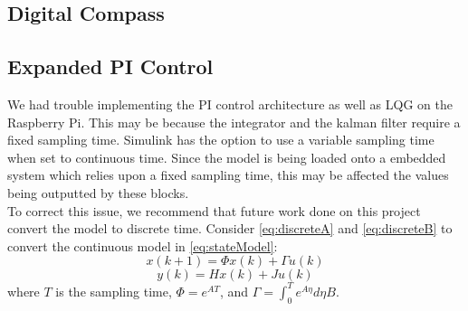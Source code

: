 \subsection{Digital Compass}

\subsection{Expanded PI Control}
We had trouble implementing the PI control architecture as well as LQG on the Raspberry Pi. This may be because the integrator and the kalman filter require a fixed sampling time.  Simulink has the option to use a variable sampling time when set to continuous time.  Since the model is being loaded onto a embedded system which relies upon a fixed sampling time, this may be affected the values being outputted by these blocks.\\
To correct this issue, we recommend that future work done on this project convert the model to discrete time.  Consider \ref{eq:discreteA} and \ref{eq:discreteB} to convert the continuous model in \ref{eq:stateModel}:
\begin{equation}
\label{eq:discreteA}
    x(k+1)=\Phi x(k)+\Gamma u(k)
\end{equation}
\begin{equation}
\label{eq:discreteB}
    y(k)=Hx(k)+Ju(k)
\end{equation}
where $T$ is the sampling time, $\Phi=e^{AT}$, and $\Gamma=\int_0^T e^{A\eta} d\eta B$.



